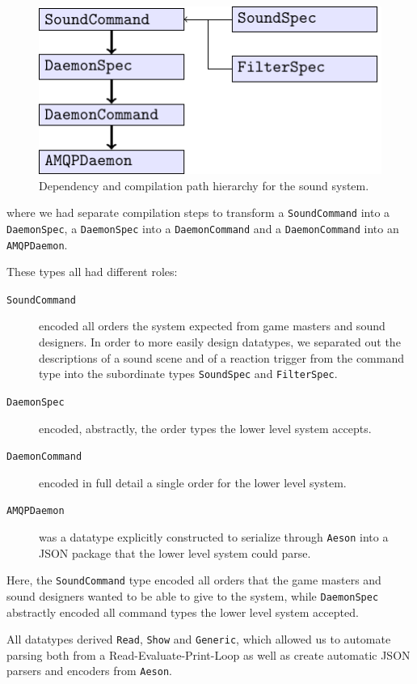 \begin{figure}[H]
  \centering
  \includegraphics{figure}
  \vspace{1em}
  
  \caption{Dependency and compilation path hierarchy for the sound system.}
\label{fig:sshierarchy}
\end{figure}
where we had separate compilation steps to transform a \texttt{SoundCommand}
into a \texttt{DaemonSpec}, a \texttt{DaemonSpec} into a \texttt{DaemonCommand} and a
\texttt{DaemonCommand} into an \texttt{AMQPDaemon}.

These types all had different roles:
\begin{description}
\item[\tt SoundCommand] encoded all orders the system expected from
  game masters and sound designers. In order to more easily design
  datatypes, we separated out the descriptions of a sound scene and of
  a reaction trigger from the command type into the subordinate types
  \texttt{SoundSpec} and \texttt{FilterSpec}.
\item[\tt DaemonSpec] encoded, abstractly, the order types the lower
  level system accepts.
\item[\tt DaemonCommand] encoded in full detail a single order for the
  lower level system.
\item[\tt AMQPDaemon] was a datatype explicitly constructed to serialize
  through \texttt{Aeson} into a JSON package that the lower level
  system could parse.
\end{description}

Here, the \texttt{SoundCommand} type encoded all orders that the game
masters and sound designers wanted to be able to give to the system, while
\texttt{DaemonSpec} abstractly encoded all command types the lower
level system accepted.

All datatypes derived \texttt{Read}, \texttt{Show} and \texttt{Generic},
which allowed us to automate parsing both from a Read-Evaluate-Print-Loop as well as
create automatic JSON parsers and encoders from \texttt{Aeson}. 

